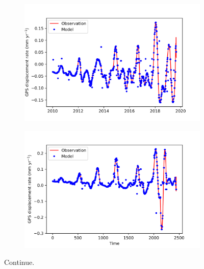 \documentclass{article}
\begin{document}
\begin{figure}[h!]
     \centering
     \begin{subfigure}[b]{0.48\textwidth}
         \centering
         \includegraphics[width=\textwidth, height = 0.88
         \textwidth ]{P435.png}
         
     \end{subfigure}
     \hfill
     \begin{subfigure}[b]{0.48\textwidth}
         \centering
         \includegraphics[width=\textwidth, height = 0.88
         \textwidth ]{ALBH.png}
         \label{fig:3}
     \end{subfigure}
     \caption{Continue.}
\end{figure}
\end{document}
